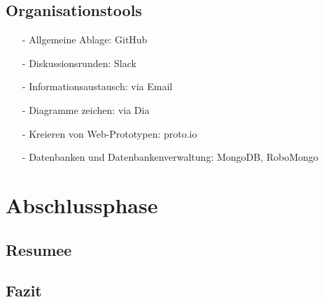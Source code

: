 \documentclass[12pt,a4paper]{article}
\begin{document}
\newpage
\subsection{Organisationstools}
\begin{itemize}
\item[-]Allgemeine Ablage: GitHub
\item[-]Diskussionsrunden: Slack
\item[-]Informationsaustausch: via Email
\item[-]Diagramme zeichen: via Dia 
\item[-]Kreieren von Web-Prototypen: proto.io
\item[-]Datenbanken und Datenbankenverwaltung: MongoDB, RoboMongo
\end{itemize}

\newpage
\section{Abschlussphase}
\subsection{Resumee}
\newpage
\subsection{Fazit}
\newpage
\end{document}
